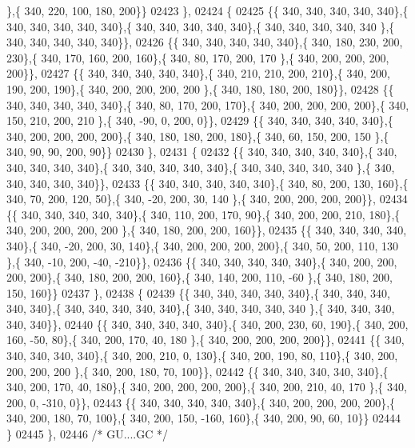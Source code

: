 \begin{DoxyCode}
      \},\{ 340, 220, 100, 180, 200\}\}
02423 \},
02424 \{
02425 \{\{ 340, 340, 340, 340, 340\},\{ 340, 340, 340, 340, 340\},\{ 340, 340, 340, 340, 340\},\{ 340, 340, 340, 340, 340
      \},\{ 340, 340, 340, 340, 340\}\},
02426 \{\{ 340, 340, 340, 340, 340\},\{ 340, 180, 230, 200, 230\},\{ 340, 170, 160, 200, 160\},\{ 340,  80, 170, 200, 170
      \},\{ 340, 200, 200, 200, 200\}\},
02427 \{\{ 340, 340, 340, 340, 340\},\{ 340, 210, 210, 200, 210\},\{ 340, 200, 190, 200, 190\},\{ 340, 200, 200, 200, 200
      \},\{ 340, 180, 180, 200, 180\}\},
02428 \{\{ 340, 340, 340, 340, 340\},\{ 340,  80, 170, 200, 170\},\{ 340, 200, 200, 200, 200\},\{ 340, 150, 210, 200, 210
      \},\{ 340, -90,   0, 200,   0\}\},
02429 \{\{ 340, 340, 340, 340, 340\},\{ 340, 200, 200, 200, 200\},\{ 340, 180, 180, 200, 180\},\{ 340,  60, 150, 200, 150
      \},\{ 340,  90,  90, 200,  90\}\}
02430 \},
02431 \{
02432 \{\{ 340, 340, 340, 340, 340\},\{ 340, 340, 340, 340, 340\},\{ 340, 340, 340, 340, 340\},\{ 340, 340, 340, 340, 340
      \},\{ 340, 340, 340, 340, 340\}\},
02433 \{\{ 340, 340, 340, 340, 340\},\{ 340,  80, 200, 130, 160\},\{ 340,  70, 200, 120,  50\},\{ 340, -20, 200,  30, 140
      \},\{ 340, 200, 200, 200, 200\}\},
02434 \{\{ 340, 340, 340, 340, 340\},\{ 340, 110, 200, 170,  90\},\{ 340, 200, 200, 210, 180\},\{ 340, 200, 200, 200, 200
      \},\{ 340, 180, 200, 200, 160\}\},
02435 \{\{ 340, 340, 340, 340, 340\},\{ 340, -20, 200,  30, 140\},\{ 340, 200, 200, 200, 200\},\{ 340,  50, 200, 110, 130
      \},\{ 340, -10, 200, -40, -210\}\},
02436 \{\{ 340, 340, 340, 340, 340\},\{ 340, 200, 200, 200, 200\},\{ 340, 180, 200, 200, 160\},\{ 340, 140, 200, 110, -60
      \},\{ 340, 180, 200, 150, 160\}\}
02437 \},
02438 \{
02439 \{\{ 340, 340, 340, 340, 340\},\{ 340, 340, 340, 340, 340\},\{ 340, 340, 340, 340, 340\},\{ 340, 340, 340, 340, 340
      \},\{ 340, 340, 340, 340, 340\}\},
02440 \{\{ 340, 340, 340, 340, 340\},\{ 340, 200, 230,  60, 190\},\{ 340, 200, 160, -50,  80\},\{ 340, 200, 170,  40, 180
      \},\{ 340, 200, 200, 200, 200\}\},
02441 \{\{ 340, 340, 340, 340, 340\},\{ 340, 200, 210,   0, 130\},\{ 340, 200, 190,  80, 110\},\{ 340, 200, 200, 200, 200
      \},\{ 340, 200, 180,  70, 100\}\},
02442 \{\{ 340, 340, 340, 340, 340\},\{ 340, 200, 170,  40, 180\},\{ 340, 200, 200, 200, 200\},\{ 340, 200, 210,  40, 170
      \},\{ 340, 200,   0, -310,   0\}\},
02443 \{\{ 340, 340, 340, 340, 340\},\{ 340, 200, 200, 200, 200\},\{ 340, 200, 180,  70, 100\},\{ 340, 200, 150, -160, 
      160\},\{ 340, 200,  90,  60,  10\}\}
02444 \}
02445 \},
02446 \textcolor{comment}{/* GU....GC */}

\end{DoxyCode}
